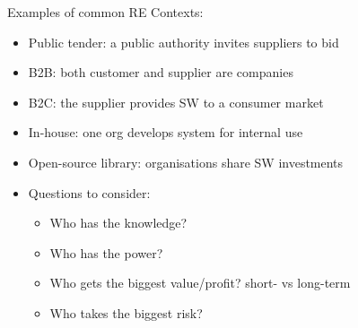 
\begin{Slide}{Examples of common RE Contexts:}
\begin{itemize}
\item Public tender: a public authority invites suppliers to bid
\item B2B: both customer and supplier are companies
\item B2C: the supplier provides SW to a consumer market
\item In-house: one org develops system for internal use
\item Open-source library: organisations share SW investments 


\item Questions to consider:
\begin{itemize}
\item Who has the knowledge?
\item Who has the power?
\item Who gets the biggest value/profit? short- vs long-term
\item Who takes the biggest risk?

\end{itemize}
\end{itemize}
\end{Slide}